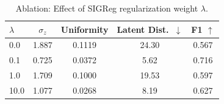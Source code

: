 \begin{table}[t]
\centering
\caption{Ablation: Effect of SIGReg regularization weight $\lambda$.}
\label{tab:ablation_lambda}
\begin{tabular}{lcccc}
\toprule
$\lambda$ & $\sigma_z$ & Uniformity & Latent Dist.\ $\downarrow$ & F1 $\uparrow$ \\
\midrule
  0.0 & 1.887 & 0.1119 & 24.30 & 0.567 \\
  0.1 & 0.725 & 0.0372 & 5.62 & 0.716 \\
  1.0 & 1.709 & 0.1000 & 19.53 & 0.597 \\
  10.0 & 1.077 & 0.0268 & 8.19 & 0.627 \\
\bottomrule
\end{tabular}
\end{table}
